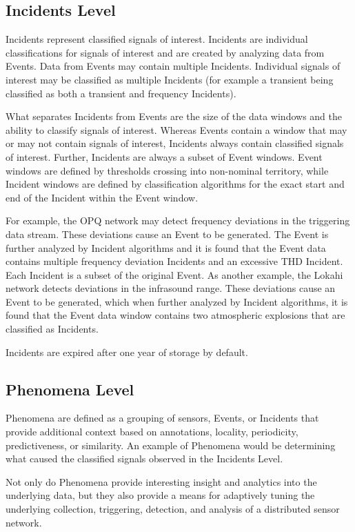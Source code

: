 \subsection{Incidents Level}\label{subsec:incidents-level}
Incidents represent classified signals of interest. Incidents are individual classifications for signals of interest and are created by analyzing data from Events. Data from Events may contain multiple Incidents. Individual signals of interest may be classified as multiple Incidents (for example a transient being classified as both a transient and frequency Incidents).

What separates Incidents from Events are the size of the data windows and the ability to classify signals of interest. Whereas Events contain a window that may or may not contain signals of interest, Incidents always contain classified signals of interest. Further, Incidents are always a subset of Event windows. Event windows are defined by thresholds crossing into non-nominal territory, while Incident windows are defined by classification algorithms for the exact start and end of the Incident within the Event window.

For example, the OPQ network may detect frequency deviations in the triggering data stream. These deviations cause an Event to be generated. The Event is further analyzed by Incident algorithms and it is found that the Event data contains multiple frequency deviation Incidents and an excessive THD Incident. Each Incident is a subset of the original Event. As another example, the Lokahi network detects deviations in the infrasound range. These deviations cause an Event to be generated, which when further analyzed by Incident algorithms, it is found that the Event data window contains two atmospheric explosions that are classified as Incidents.

Incidents are expired after one year of storage by default.

\subsection{Phenomena Level}\label{subsec:phenomena-level}
Phenomena are defined as a grouping of sensors, Events, or Incidents that provide additional context based on annotations, locality, periodicity, predictiveness, or similarity. An example of Phenomena would be determining what caused the classified signals observed in the Incidents Level.

Not only do Phenomena provide interesting insight and analytics into the underlying data, but they also provide a means for adaptively tuning the underlying collection, triggering, detection, and analysis of a distributed sensor network.

